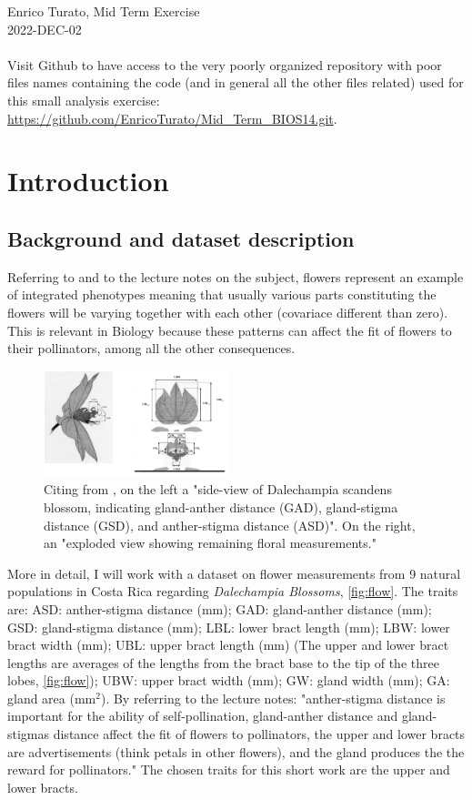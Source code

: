 \documentclass{article}
\begin{document}
        \large
        Enrico Turato, Mid Term Exercise\\
        \large
        2022-DEC-02\\ \\
Visit Github to have access to the very poorly organized repository with poor files names containing the code (and in general all the other files related) used for this small analysis exercise: \url{https://github.com/EnricoTurato/Mid_Term_BIOS14.git}.
%
\section{Introduction}
\subsection{Background and dataset description}
Referring to \cite{paper} and to the lecture notes on the subject, flowers represent an example of integrated phenotypes meaning that usually various parts constituting the flowers will be varying together with each other (covariace different than zero). This is relevant in Biology because these patterns can affect the fit of flowers to their pollinators, among all the other consequences.
\begin{figure}
  \begin{center}
    \includegraphics[width=0.48\textwidth]{flower.PNG}
  \end{center}
  \caption{Citing from \cite{paper}, on the left a "side-view of Dalechampia scandens blossom, indicating gland-anther distance (GAD), gland-stigma distance (GSD), and anther-stigma distance (ASD)". On the right, an "exploded view showing remaining ﬂoral measurements."}
  \label{fig:flow}
\end{figure}
More in detail, I will work with a dataset on flower measurements from 9 natural populations in Costa Rica regarding \emph{Dalechampia Blossoms}, \autoref{fig:flow}.
The traits are: ASD: anther-stigma distance (mm); GAD: gland-anther distance (mm); GSD: gland-stigma distance (mm); LBL: lower bract length (mm); LBW: lower bract width (mm); UBL: upper bract length (mm) (The upper and lower
bract lengths are averages of the lengths from the bract base to the tip of the three lobes, \autoref{fig:flow}); UBW: upper bract width (mm); GW: gland width (mm); GA: gland area (mm$^2$).
By referring to the lecture notes: "anther-stigma distance is important for the ability of self-pollination, gland-anther distance and gland-stigmas distance affect the fit of flowers to pollinators, the upper and lower bracts are advertisements (think petals in other flowers), and the gland produces the the reward for pollinators." The chosen traits for this short work are the upper and lower bracts.
\end{document}
